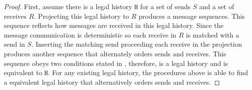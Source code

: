 \begin{proof}
First, assume there is a legal history $\mathtt{H}$ for a set of sends $\mathit{S}$ and a set of receives $\mathit{R}$. 
Projecting this legal history to $\mathit{R}$ produces a message sequences. This sequence reflects how messages are received in this legal history. Since the message communication is deterministic so each receive in $\mathit{R}$ is matched with a send in $\mathit{S}$. Inserting the matching send proceeding each receive in the projection produces another sequence that alternately orders sends and receives. This sequence obeys two conditions stated in , therefore, is a legal history and is equivalent to $\mathtt{H}$.
For any existing legal history, the procedures above is able to find a equivalent legal history that alternatively orders sends and receives.  
\end{proof}



 


